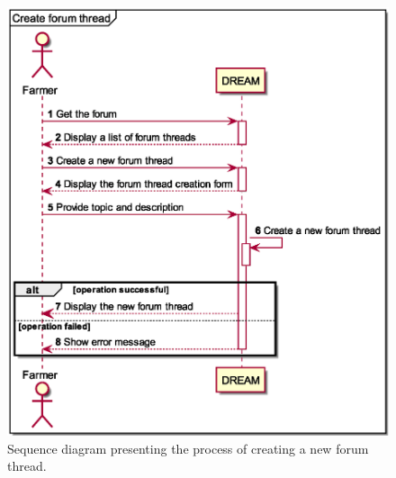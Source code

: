 \begin{figure}[H]
    \centering
    \includegraphics[scale=0.6, keepaspectratio, origin=c]{diagrams/sequence/create_forum_thread}
    \caption{Sequence diagram presenting the process of creating a new forum thread.}
    \label{fig:sd_create_forum_thread}
\end{figure}

